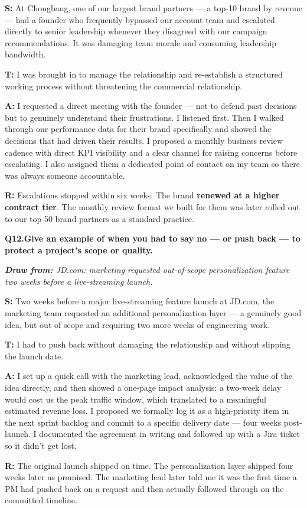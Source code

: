 \documentclass[10pt, letterpaper]{article}
\newcommand{\q}[2]{%
    \smallskip
    \noindent\textbf{\small Q#1.}\quad\textbf{#2}
    \vspace{3pt}
}
\newcommand{\hint}[1]{%
    \begin{notebox}
    \footnotesize\textit{\textbf{Draw from:} #1}
    \end{notebox}
}
\newcommand{\s}[1]{\textbf{\textcolor{starlabel}{S:}} #1}
\newcommand{\ta}[1]{\textbf{\textcolor{starlabel}{T:}} #1}
\newcommand{\ac}[1]{\textbf{\textcolor{starlabel}{A:}} #1}
\newcommand{\res}[1]{\textbf{\textcolor{starlabel}{R:}} #1}
\begin{document}
\begin{answerbox}
\footnotesize
\s{At Chongbang, one of our largest brand partners --- a top-10 brand by revenue --- had a founder who frequently bypassed our account team and escalated directly to senior leadership whenever they disagreed with our campaign recommendations. It was damaging team morale and consuming leadership bandwidth.}

\medskip
\ta{I was brought in to manage the relationship and re-establish a structured working process without threatening the commercial relationship.}

\medskip
\ac{I requested a direct meeting with the founder --- not to defend past decisions but to genuinely understand their frustrations. I listened first. Then I walked through our performance data for their brand specifically and showed the decisions that had driven their results. I proposed a monthly business review cadence with direct KPI visibility and a clear channel for raising concerns before escalating. I also assigned them a dedicated point of contact on my team so there was always someone accountable.}

\medskip
\res{Escalations stopped within six weeks. The brand \textbf{renewed at a higher contract tier}. The monthly review format we built for them was later rolled out to our top 50 brand partners as a standard practice.}
\end{answerbox}

\q{12}{Give an example of when you had to say no --- or push back --- to protect a project's scope or quality.}
\hint{JD.com: marketing requested out-of-scope personalization feature two weeks before a live-streaming launch.}

\begin{answerbox}
\footnotesize
\s{Two weeks before a major live-streaming feature launch at JD.com, the marketing team requested an additional personalization layer --- a genuinely good idea, but out of scope and requiring two more weeks of engineering work.}

\medskip
\ta{I had to push back without damaging the relationship and without slipping the launch date.}

\medskip
\ac{I set up a quick call with the marketing lead, acknowledged the value of the idea directly, and then showed a one-page impact analysis: a two-week delay would cost us the peak traffic window, which translated to a meaningful estimated revenue loss. I proposed we formally log it as a high-priority item in the next sprint backlog and commit to a specific delivery date --- four weeks post-launch. I documented the agreement in writing and followed up with a Jira ticket so it didn't get lost.}

\medskip
\res{The original launch shipped on time. The personalization layer shipped four weeks later as promised. The marketing lead later told me it was the first time a PM had pushed back on a request and then actually followed through on the committed timeline.}
\end{answerbox}
\end{document}
